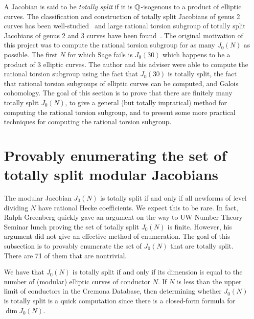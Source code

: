 \documentclass[11pt, proquest]{uwthesis}
\begin{document}
A Jacobian is said to be \emph{totally split} if it is $\mathbb{Q}$-isogenous to a
product of elliptic curves. The classification and construction of totally
split Jacobians of genus 2 curves has been
well-studied~\cite{bruin-doerksen:split_genus_two,kuhn:split_genus_two}
and large rational torsion subgroup of totally split Jacobians of genus 2 and 3
curves have been found~\cite{howe-leprevost-poonen:large}. The original
motivation of this project was to compute the rational torsion subgroup for as
many $J_0(N)$ as possible. The first $N$ for which Sage fails is $J_0(30)$
which happens to be a product of 3 elliptic curves. The author and his adviser
were able to compute the rational torsion subgroup using the fact that
$J_0(30)$ is totally split, the fact that rational torsion subgroups of
elliptic curves can be computed, and Galois cohomology. The goal of this
section is to prove that there are finitely many totally split $J_0(N)$, to
give a general (but totally impratical) method for computing the rational
torsion subgroup, and to present some more practical techniques for computing
the rational torsion subgroup. 


\section{Provably enumerating the set of totally split modular Jacobians}

The modular Jacobian $J_0(N)$ is totally split if and only if all newforms of
level dividing $N$ have rational Hecke coefficients. We expect this to be rare.
In fact, Ralph Greenberg quickly gave an argument on the way to UW Number
Theory Seminar lunch proving the set of totally split $J_0(N)$ is finite.
However, his argument did not give an effective method of enumeration. The goal
of this subsection is to provably enumerate the set of $J_0(N)$ that are
totally split. There are 71 of them that are nontrivial.

We have that $J_0(N)$ is totally split if and only if its dimension is equal to
the number of (modular) elliptic curves of conductor $N$. If $N$ is less than
the upper limit of conductors in the Cremona Database, then determining whether
$J_0(N)$ is totally split is a quick computation since there is a closed-form
formula for $\dim J_0(N)$.  
\end{document}
